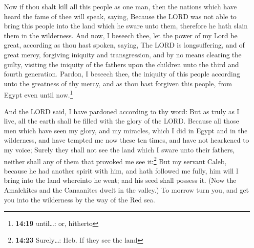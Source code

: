  Now if thou shalt kill all this people as one man, then
the nations which have heard the fame of thee will speak, saying,
 Because the LORD was not able to bring this people into
the land which he sware unto them, therefore he hath slain them in the
wilderness.  And now, I beseech thee, let the power of my
Lord be great, according as thou hast spoken, saying, 
The LORD is longsuffering, and of great mercy, forgiving iniquity and
transgression, and by no means clearing the guilty, visiting the
iniquity of the fathers upon the children unto the third and fourth
generation.  Pardon, I beseech thee, the iniquity of this
people according unto the greatness of thy mercy, and as thou hast
forgiven this people, from Egypt even until now.\footnote{\textbf{14:19}
  until\ldots: or, hitherto}

 And the LORD said, I have pardoned according to thy
word:  But as truly as I live, all the earth shall be
filled with the glory of the LORD.  Because all those men
which have seen my glory, and my miracles, which I did in Egypt and in
the wilderness, and have tempted me now these ten times, and have not
hearkened to my voice;  Surely they shall not see the
land which I sware unto their fathers, neither shall any of them that
provoked me see it:\footnote{\textbf{14:23} Surely\ldots: Heb. If they
  see the land}  But my servant Caleb, because he had
another spirit with him, and hath followed me fully, him will I bring
into the land whereinto he went; and his seed shall possess it.
 (Now the Amalekites and the Canaanites dwelt in the
valley.) To morrow turn you, and get you into the wilderness by the way
of the Red sea.

